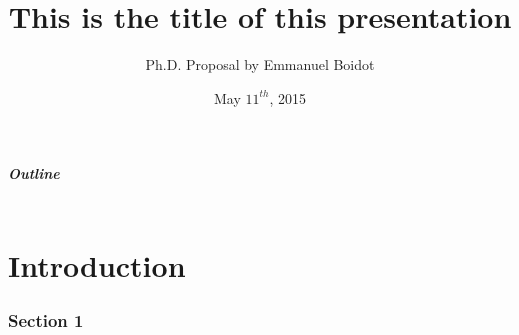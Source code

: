 \documentclass[10pt,compress]{beamer}
\title[Reduced title] %
{This is the title of this presentation}
\author[E. Boidot]{Ph.D. Proposal by Emmanuel Boidot}
\institute %
{Advisor: Dr. Eric Feron \\ Georgia Institute of Technology\\
  Guggenheim School of Aerospace Engineering}
\date{May $11^{th}$, 2015} %
\begin{document}
{
\setlength{\headheight}{0in}

\begin{frame}
\titlepage
\end{frame}
}
\addtocounter{framenumber}{-1}

{
\begin{frame}\frametitle{Outline}
  \begin{columns}
  	\begin{column}{.7\textwidth}
  		\begin{tocblock}{}
  		\vspace*{1em}\tableofcontents[onlyparts]
  		\end{tocblock}		
  	\end{column}
  \end{columns}
\end{frame} 
}

\part[Intro]{Introduction} 

\section{Section 1}
\end{document}
